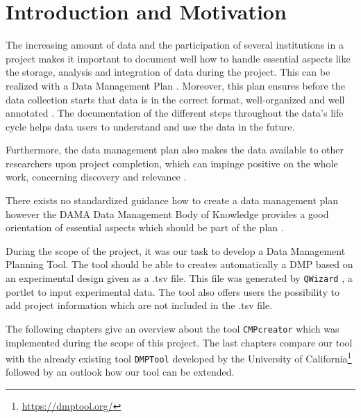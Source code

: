 
\section{Introduction and Motivation}
The increasing amount of data and the participation of several institutions in a project makes it important to document well how to handle essential aspects like the storage, analysis and integration of data during the project. This can be realized with a Data Management Plan \cite{lecture}. Moreover, this plan ensures before the data collection starts that data is in the correct format, well-organized and well annotated \cite{planWhy}. The documentation of the different steps throughout the data's life cycle helps data users to understand and use the data in the future. 

Furthermore, the data management plan also makes the data available to other researchers upon project completion, which can impinge positive on the whole work, concerning discovery and relevance \cite{planWhy}.


There exists no standardized guidance how to create a data management plan however the DAMA Data Management Body of Knowledge \cite{DAMAInternational:2009:DGD:1593444} provides a good orientation of essential aspects which should be part of the plan \cite{lecture}. 


During the scope of the project, it was our task to develop a Data Management Planning Tool. The tool should be able to creates automatically a DMP based on an experimental design given as a .tsv file. This file was generated by \texttt{QWizard} \cite{qwizard}, a portlet to input experimental data. The tool also offers users the possibility to add project information which are not included in the .tsv file.


The following chapters give an overview about the tool \texttt{CMPcreator} which was implemented during the scope of this project. The last chapters compare our tool with the  already existing tool \texttt{DMPTool} developed by the University of California\footnote{\url{https://dmptool.org/}} followed by an outlook how our tool can be extended.

